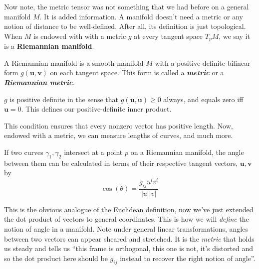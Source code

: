 	
	Now note, the metric tensor was not something that we had before on a general manifold $M$. It is added information. A manifold doesn't need a metric or any notion of distance to be well-defined. After all, its definition is just topological. When $M$ is endowed with with a metric $g$ at every tangent space $T_p M$, we say it is a \textbf{Riemannian manifold}. 
	\begin{defn}
		A Riemannian manifold is a smooth manifold $M$ with a positive definite bilinear form $g(\mathbf u, \mathbf v)$ on each tangent space. This form is called a \emph{\textbf{metric}} or a \emph{\textbf{Riemannian metric}}.
		
		$g$ is positive definite in the sense that $g(\mathbf u, \mathbf u) \geq 0$ always, and equals zero iff $\mathbf u = 0$. This defines our positive-definite inner product. 
	\end{defn}
	This condition ensures that every nonzero vector has positive length. Now, endowed with a metric, we can measure lengths of curves, and much more. 
	\begin{prop}
		If two curves $\gamma_1, \gamma_2$ intersect at a point $p$ on a Riemannian manifold, the angle between them can be calculated in terms of their respective tangent vectors, $\mathbf u, \mathbf v$ by
		\begin{equation}
			\cos(\theta)=\frac{g_{ij} u^i v^i}{|u| |v|}
		\end{equation}
	\end{prop}
	This is the obvious analogue of the Euclidean definition, now we've just extended the dot product of vectors to general coordinates. This is how we will \emph{define} the notion of angle in a manifold. Note under general linear transformations, angles between two vectors can appear sheared and stretched. It is the \emph{metric} that holds us steady and tells us ``this frame is orthogonal, this one is not, it's distorted and so the dot product here should be $g_{ij}$ instead to recover the right notion of angle''.
	
